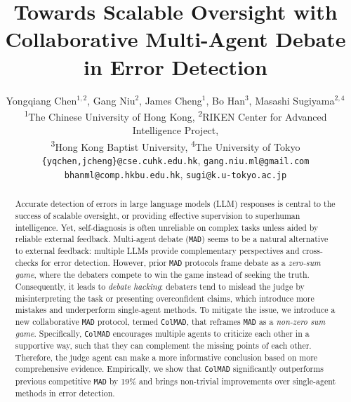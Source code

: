 \documentclass{article} %
\author{Yongqiang Chen$^{1,2}$\footnotemark[1], 
Gang Niu$^{2}$, 
James Cheng$^{1}$, 
Bo Han$^{3}$, 
Masashi Sugiyama$^{2,4}$
\vspace{1em}
\\
\textsuperscript{1}The Chinese University of Hong Kong, \hspace{0.5em} 
\textsuperscript{2}RIKEN Center for Advanced Intelligence Project,\\
\textsuperscript{3}Hong Kong Baptist University, \hspace{0.5em} 
\textsuperscript{4}The University of Tokyo\\
\texttt{\{yqchen,jcheng\}@cse.cuhk.edu.hk}, \hspace{0.5em}
\texttt{gang.niu.ml@gmail.com}\\
\texttt{bhanml@comp.hkbu.edu.hk}, \hspace{0.5em}
\texttt{sugi@k.u-tokyo.ac.jp}
}
\title{Towards Scalable Oversight with Collaborative Multi-Agent Debate in Error Detection}
\newcommand{\ours}[0]{\texttt{ColMAD}\xspace}
\newcommand{\mad}[0]{\texttt{MAD}\xspace}
\newcommand{\my}[1]{{\color{deepgreen}{(Mao: #1)}}}
\begin{document}

\maketitle



\begin{abstract}
Accurate detection of errors in large language models (LLM) responses is central to the success of scalable oversight, or providing effective supervision to superhuman intelligence.
Yet, self-diagnosis is often unreliable on complex tasks unless aided by reliable external feedback. 
%
Multi-agent debate (\mad) seems to be a natural alternative to external feedback: multiple LLMs provide complementary perspectives and cross-checks for error detection.
However, prior \mad protocols frame debate as a \textit{zero-sum game}, where the debaters compete to win the game instead of seeking the truth. Consequently, it leads to \textit{debate hacking}: debaters tend to mislead the judge by misinterpreting the task or presenting overconfident claims, which introduce more mistakes and underperform single-agent methods.
%
%
%
To mitigate the issue, we introduce a new collaborative \mad protocol, termed \ours, that reframes \mad as a \textit{non-zero sum game}.
Specifically, \ours encourages multiple agents to criticize each other in a supportive way, such that they can complement the missing points of each other. Therefore, the judge agent can make a more informative conclusion based on more comprehensive evidence.
%
Empirically, we show that \ours significantly outperforms previous competitive \mad by 19\% and brings non-trivial improvements over single-agent methods in error detection.
\end{abstract}
\end{document}
